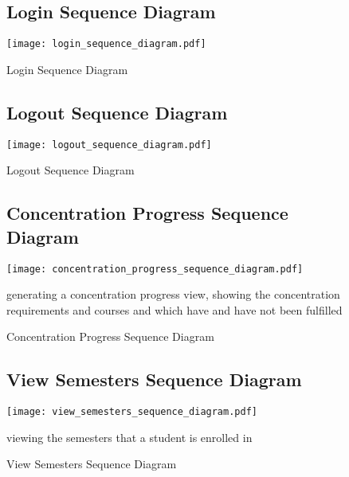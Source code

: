 \documentclass[12pt]{article}
\begin{document}
\begin{figure}[p!]
  \subsection{Login Sequence Diagram}
  \centering
  \texttt{[image: login\_sequence\_diagram.pdf]}
  \caption{Login Sequence Diagram}
  \label{fig:loginSequenceDiagram}
\end{figure}

\begin{figure}[p!]
  \subsection{Logout Sequence Diagram}
  \centering
  \texttt{[image: logout\_sequence\_diagram.pdf]}
  \caption{Logout Sequence Diagram}
  \label{fig:logoutSequenceDiagram}
\end{figure}

\begin{figure}[p!]
  \subsection{Concentration Progress Sequence Diagram}
  \centering
  \texttt{[image: concentration\_progress\_sequence\_diagram.pdf]}
  \caption{Concentration Progress Sequence Diagram}
  \label{fig:concentrationProgressSequenceDiagram}
  {generating a concentration progress view, showing the concentration requirements and courses and
  which have and have not been fulfilled}
\end{figure}

\begin{figure}[p!]
  \subsection{View Semesters Sequence Diagram}
  \centering
  \texttt{[image: view\_semesters\_sequence\_diagram.pdf]}
  \caption{View Semesters Sequence Diagram}
  \label{fig:viewSemestersSequenceDiagram}
  {viewing the semesters that a student is enrolled in}
\end{figure}
\end{document}
